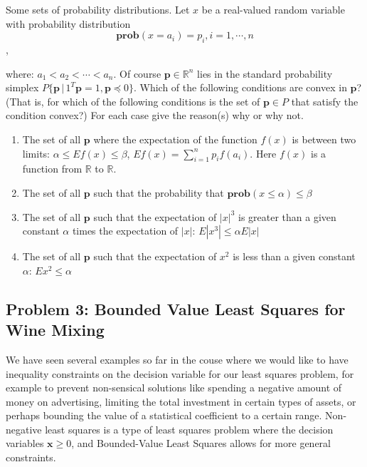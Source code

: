 \documentclass[
  letterpaper,
  DIV=11,
  numbers=noendperiod]{scrartcl}
\providecommand{\tightlist}{%
  \setlength{\itemsep}{0pt}\setlength{\parskip}{0pt}}\usepackage{longtable,booktabs,array}
\begin{document}
Some sets of probability distributions. Let \(x\) be a real-valued
random variable with probability distribution
\[\mathbf{prob}(x = a_i) = p_i, i = 1, \cdots, n\],

where: \(a_1 < a_2 < \cdots < a_n\). Of course
\(\mathbf{p} \in \mathbb{R}^n\) lies in the standard probability simplex
\(P \{\mathbf{p}\, |\, 1^T \mathbf{p} = 1, \mathbf{p} \preceq 0\}\).
Which of the following conditions are convex in \(\mathbf{p}\)? (That
is, for which of the following conditions is the set of
\(\mathbf{p} \in P\) that satisfy the condition convex?) For each case
give the reason(s) why or why not.

\begin{enumerate}
\def\labelenumi{\alph{enumi}.}
\tightlist
\item
  The set of all \(\mathbf{p}\) where the expectation of the function
  \(f(x)\) is between two limits: \(\alpha \leq Ef(x) \leq \beta\),
  \(Ef(x) = \sum_{i=1}^n p_i f(a_i)\). Here \(f(x)\) is a function from
  \(\mathbb{R}\) to \(\mathbb{R}\).
\item
  The set of all \(\mathbf{p}\) such that the probability that
  \(\mathbf{prob}(x\leq\alpha) \leq \beta\)
\item
  The set of all \(\mathbf{p}\) such that the expectation of \(|x|^3\)
  is greater than a given constant \(\alpha\) times the expectation of
  \(|x|\): \(E|x^3| \leq \alpha  E|x|\)
\item
  The set of all \(\mathbf{p}\) such that the expectation of \(x^2\) is
  less than a given constant \(\alpha\): \(Ex^2 \leq \alpha\)
\end{enumerate}

\subsection{Problem 3: Bounded Value Least Squares for Wine
Mixing}\label{problem-3-bounded-value-least-squares-for-wine-mixing}

We have seen several examples so far in the couse where we would like to
have inequality constraints on the decision variable for our least
squares problem, for example to prevent non-sensical solutions like
spending a negative amount of money on advertising, limiting the total
investment in certain types of assets, or perhaps bounding the value of
a statistical coefficient to a certain range. Non-negative least squares
is a type of least squares problem where the decision variables
\(\mathbf{x}\geq 0\), and Bounded-Value Least Squares allows for more
general constraints.
\end{document}
